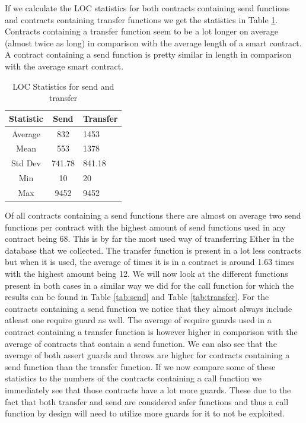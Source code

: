\documentclass[sigconf]{acmart}
\begin{document}
If we calculate the LOC statistics for both contracts containing send functions and contracts containing transfer functions we get the statistics in Table \ref{tab:loc}. Contracts containing a transfer function seem to be a lot longer on average (almost twice as long) in comparison with the average length of a smart contract. A contract containing a send function is pretty similar in length in comparison with the average smart contract.
\begin{table}
  \caption{LOC Statistics for send and transfer}
  \label{tab:loc}
  \begin{tabular}{ccl}
    \toprule
    Statistic & Send & Transfer\\
    \midrule
    Average&832&1453\\
    Mean&553&1378\\
    Std Dev&741.78&841.18\\
    Min&10&20\\
    Max&9452&9452\\
  \bottomrule
\end{tabular}
\end{table}

Of all contracts containing a send functions there are almost on average two send functions per contract with the highest amount of send functions used in any contract being 68. This is by far the most used way of transferring Ether in the database that we collected. The transfer function is present in a lot less contracts but when it is used, the average of times it is in a contract is around 1.63 times with the highest amount being 12. 
We will now look at the different functions present in both cases in a similar way we did for the call function for which the results can be found in Table \ref{tab:send} and Table \ref{tab:transfer}. For the contracts containing a send function we notice that they almost always include atleast one require guard as well. The average of require guards used in a contract containing a transfer function is however higher in comparison with the average of contracts that contain a send function. We can also see that the average of both assert guards and throws are higher for contracts containing a send function than the transfer function. If we now compare some of these statistics to the numbers of the contracts containing a call function we immediately see that those contracts have a lot more guards. These due to the fact that both transfer and send are considered safer functions and thus a call function by design will need to utilize more guards for it to not be exploited.
\end{document}
